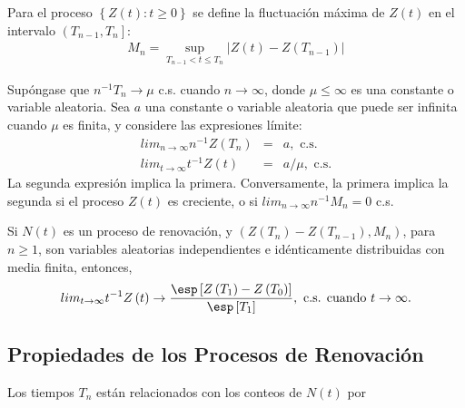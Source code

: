 \begin{Def}
Para el proceso $\left\{Z\left(t\right):t\geq0\right\}$ se define la fluctuaci\'on m\'axima de $Z\left(t\right)$ en el intervalo $\left(T_{n-1},T_{n}\right]$:
\begin{eqnarray*}
M_{n}=\sup_{T_{n-1}<t\leq T_{n}}|Z\left(t\right)-Z\left(T_{n-1}\right)|
\end{eqnarray*}
\end{Def}

\begin{Teo}
Sup\'ongase que $n^{-1}T_{n}\rightarrow\mu$ c.s. cuando $n\rightarrow\infty$, donde $\mu\leq\infty$ es una constante o variable aleatoria. Sea $a$ una constante o variable aleatoria que puede ser infinita cuando $\mu$ es finita, y considere las expresiones l\'imite:
\begin{eqnarray}
lim_{n\rightarrow\infty}n^{-1}Z\left(T_{n}\right)&=&a,\textrm{ c.s.}\\
lim_{t\rightarrow\infty}t^{-1}Z\left(t\right)&=&a/\mu,\textrm{ c.s.}
\end{eqnarray}
La segunda expresi\'on implica la primera. Conversamente, la primera implica la segunda si el proceso $Z\left(t\right)$ es creciente, o si $lim_{n\rightarrow\infty}n^{-1}M_{n}=0$ c.s.
\end{Teo}

\begin{Coro}
Si $N\left(t\right)$ es un proceso de renovaci\'on, y $\left(Z\left(T_{n}\right)-Z\left(T_{n-1}\right),M_{n}\right)$, para $n\geq1$, son variables aleatorias independientes e id\'enticamente distribuidas con media finita, entonces,
\begin{eqnarray}
lim_{t\rightarrow\infty}t^{-1}Z\left(t\right)\rightarrow\frac{\esp\left[Z\left(T_{1}\right)-Z\left(T_{0}\right)\right]}{\esp\left[T_{1}\right]},\textrm{ c.s. cuando  }t\rightarrow\infty.
\end{eqnarray}
\end{Coro}

%
\subsection{Propiedades de los Procesos de Renovaci\'on}
%

Los tiempos $T_{n}$ est\'an relacionados con los conteos de $N\left(t\right)$ por


